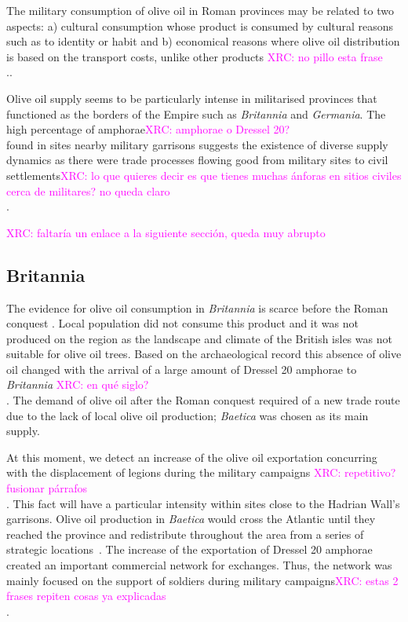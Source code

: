 \documentclass[review]{elsarticle}
\newcommand{\memo}[2]{\textcolor{#1}{#2}}
\newcommand{\xavi}[1]{\memo{magenta}{XRC: #1\\}}
\begin{document}
The military consumption of olive oil in Roman provinces may be related to two aspects: a) cultural consumption whose product is consumed by cultural reasons such as to identity or habit and b) economical reasons where olive oil distribution is based on the transport costs, unlike other products \citep[69-70]{carreras_britannia_1998}\xavi{no pillo esta frase}.. 

Olive oil supply seems to be particularly intense in militarised provinces that functioned as the borders of the Empire such as \textit{Britannia} and \textit{Germania}. The high percentage of amphorae\xavi{amphorae o Dressel 20?} found in sites nearby military garrisons suggests the existence of diverse supply dynamics as there were trade processes flowing good from military sites to civil settlements\citep{remesal_annona_1986, carreras_britannia_1998}\xavi{lo que quieres decir es que tienes muchas ánforas en sitios civiles cerca de militares? no queda claro}.

\xavi{faltaría un enlace a la siguiente sección, queda muy abrupto}


\subsection{Britannia}

The evidence for olive oil consumption in \textit{Britannia} is scarce before the Roman conquest \citep{funari_corpus_1996,carreras_abastecimiento_2003}. Local population did not consume this product and it was not produced on the region as the landscape and climate of the British isles was not suitable for olive oil trees\citep[161]{monfort_britanniaen_1998}. Based on the archaeological record this absence of olive oil changed with the arrival of a large amount of Dressel 20 amphorae to \textit{Britannia} \citep[1]{carreras_britannia_1998}\xavi{en qué siglo?}. The demand of olive oil after the Roman conquest required of a new trade route due to the lack of local olive oil production; \textit{Baetica} was chosen as its main supply.

At this moment, we detect an increase of the olive oil exportation concurring with the displacement of legions during the military campaigns \citep[161]{monfort_britanniaen_1998}\xavi{repetitivo? fusionar párrafos}. This fact will have a particular intensity within sites close to the Hadrian Wall's garrisons.  Olive oil production in \textit{Baetica} would cross the Atlantic until they reached the province and redistribute throughout the area from a series of strategic locations~\citep{carreras_atlantic_2012}. The increase of the exportation of Dressel 20 amphorae created an important commercial network for exchanges. Thus, the network was mainly focused on the support of soldiers during military campaigns\xavi{estas 2 frases repiten cosas ya explicadas}. 
\end{document}
